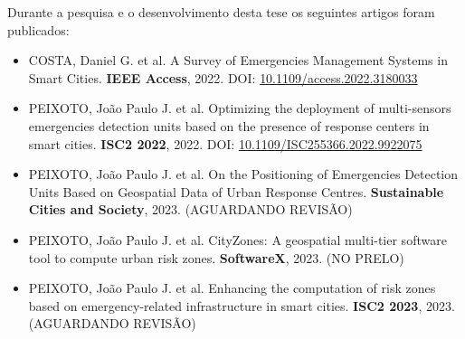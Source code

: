 \begin{refsection}
Durante a pesquisa e o desenvolvimento desta tese os seguintes artigos foram publicados:

\begin{itemize}
  \item COSTA, Daniel G. et al. A Survey of Emergencies Management Systems in Smart Cities. \textbf{IEEE Access}, 2022. DOI: \hyperref{https://doi.org/10.1109/access.2022.3180033}{}{}{10.1109/access.2022.3180033}
  \item PEIXOTO, João Paulo J. et al. Optimizing the deployment of multi-sensors emergencies detection units based on the presence of response centers in smart cities. \textbf{ISC2 2022}, 2022. DOI: \hyperref{https://doi.org/10.1109/ISC255366.2022.9922075}{}{}{10.1109/ISC255366.2022.9922075}
  \item PEIXOTO, João Paulo J. et al. On the Positioning of Emergencies Detection Units Based on Geospatial Data of Urban Response Centres. \textbf{Sustainable Cities and Society}, 2023. (AGUARDANDO REVISÃO)
  \item PEIXOTO, João Paulo J. et al. CityZones: A geospatial multi-tier software tool to compute urban risk zones. \textbf{SoftwareX}, 2023. (NO PRELO)
  \item PEIXOTO, João Paulo J. et al. Enhancing the computation of risk zones based on emergency-related infrastructure in smart cities. \textbf{ISC2 2023}, 2023. (AGUARDANDO REVISÃO)
\end{itemize}

\printbibliography[heading=subbibliography]

\end{refsection}
